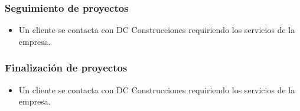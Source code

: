 \subsubsection{Seguimiento de proyectos}
\begin{itemize}
    \item Un cliente se contacta con DC Construcciones requiriendo los servicios de la empresa.     
\end{itemize}

\subsubsection{Finalización de proyectos}
\begin{itemize}
    \item Un cliente se contacta con DC Construcciones requiriendo los servicios de la empresa.   
\end{itemize}
